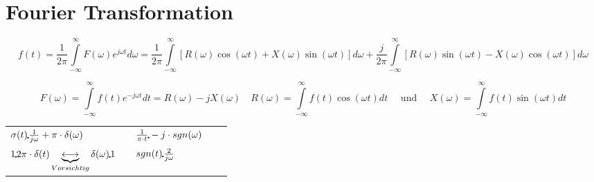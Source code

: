 \section{Fourier Transformation}
	$$\boxed{f(t) =  \frac{1}{2\pi}\int\limits_{-\infty}^{\infty}
	F(\omega)e^{j\omega t}d\omega}=\frac{1}{2
	\pi}\int\limits_{-\infty}^{\infty}[R(\omega) \cos(\omega t) + X(\omega)
	\sin(\omega t)]d\omega + \frac{j}{2 \pi}\int \limits_{-
	\infty}^{\infty}[R(\omega) \sin(\omega t)- X(\omega) \cos(\omega t)]d\omega$$
	
	$$\boxed{F(\omega) = \int\limits_{-\infty}^{\infty} f(t)e^{-j\omega t}dt}
	= R(\omega) - j X(\omega) \quad R(\omega) = \int\limits_{-\infty}^{\infty}
	f(t)\cos(\omega t)dt \quad \mbox{ und } \quad X(\omega)=
	\int\limits_{-\infty}^{\infty}f(t)\sin(\omega t)dt$$
	\begin{tabular}{lllll}
	 $ \sigma(t) \FT \frac{1}{j\omega}+\pi \cdot \delta(\omega) $ & \hspace{6mm} &
	 $ \frac{1}{\pi \cdot t} \FT -j \cdot sgn(\omega) $ & \hspace{6mm} &  \\ 
	 $ 1 \FT 2\pi \cdot \delta(t) \underbrace{\longleftrightarrow}_{Vorsichtig}
	 \delta(\omega) \FT 1 $ & & $ sgn(t) \FT \frac{2}{j\omega} $
	\end{tabular}
		
